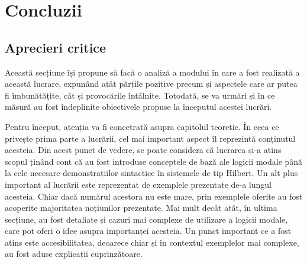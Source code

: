 \documentclass[12pt, openany]{book}
\begin{document}
    \chapter{Concluzii} %
    \label{chapter_conclusion}
        \section{Aprecieri critice} %
        \label{section_critical_appraisal}
            \par{}
                Această secțiune își propune să facă o analiză a modului în care a fost realizată a această lucrare, 
                expunând atât părțile pozitive precum și aspectele care ar putea fi îmbunătățite, cât și provocările 
                întâlnite. Totodată, se va urmări și în ce măsură au fost îndeplinite obiectivele propuse la 
                începutul acestei lucrări.
            
            \par{}
                Pentru început, atenția va fi concetrată asupra capitolul teoretic. În ceea ce privește prima parte a 
                lucrării, cel mai important aspect îl reprezintă conținutul acesteia. Din acest punct de vedere, 
                se poate considera că lucrarea și-a atins scopul ținând cont că au fost introduse conceptele de bază ale 
                logicii modale până la cele necesare demonstrațiilor sintactice în sistemele de tip Hilbert. Un alt plus 
                important al lucrării este reprezentat de exemplele prezentate de-a lungul acesteia. Chiar dacă numărul 
                acestora nu este mare, prin exemplele oferite au fost acoperite majoritatea noțiunilor prezentate. Mai 
                mult decât atât, în ultima secțiune, au fost detaliate și cazuri mai complexe de utilizare a logicii 
                modale, care pot oferi o idee asupra importanței acesteia. Un punct important ce a fost atins este 
                accesibilitatea, deoarece chiar și în contextul exemplelor mai complexe, au fost aduse explicații 
                cuprinzătoare.
            
\end{document}
